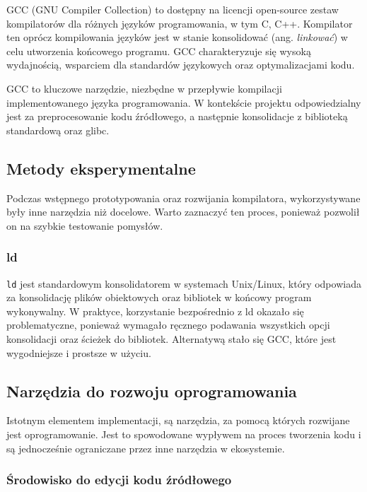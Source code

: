 GCC (GNU Compiler Collection) \cite{bib:gcc} to dostępny na licencji open-source zestaw kompilatorów dla różnych języków programowania, w tym C, C++. Kompilator ten oprócz kompilowania języków jest w stanie konsolidować (ang. \textit{linkować}) w celu utworzenia końcowego programu. GCC charakteryzuje się wysoką wydajnością, wsparciem dla standardów językowych oraz optymalizacjami kodu.

GCC to kluczowe narzędzie, niezbędne w przepływie kompilacji implementowanego języka programowania. W kontekście projektu odpowiedzialny jest za preprocesowanie kodu źródłowego, a następnie konsolidacje z biblioteką standardową oraz glibc.

\subsection{Metody eksperymentalne}

Podczas wstępnego prototypowania oraz rozwijania kompilatora, wykorzystywane były inne narzędzia niż docelowe. Warto zaznaczyć ten proces, ponieważ pozwolił on na szybkie testowanie pomysłów.

\subsubsection{ld}

\verb|ld| jest standardowym konsolidatorem w systemach Unix/Linux, który odpowiada za konsolidację plików obiektowych oraz bibliotek w końcowy program wykonywalny. W praktyce, korzystanie bezpośrednio z ld okazało się problematyczne, ponieważ wymagało ręcznego podawania wszystkich opcji konsolidacji oraz ścieżek do bibliotek. Alternatywą stało się GCC, które jest wygodniejsze i prostsze w użyciu.

\subsection{Narzędzia do rozwoju oprogramowania}

Istotnym elementem implementacji, są narzędzia, za pomocą których rozwijane jest oprogramowanie. Jest to spowodowane wypływem na proces tworzenia kodu i są jednocześnie ograniczane przez inne narzędzia w ekosystemie.

\subsubsection{Środowisko do edycji kodu źródłowego}

